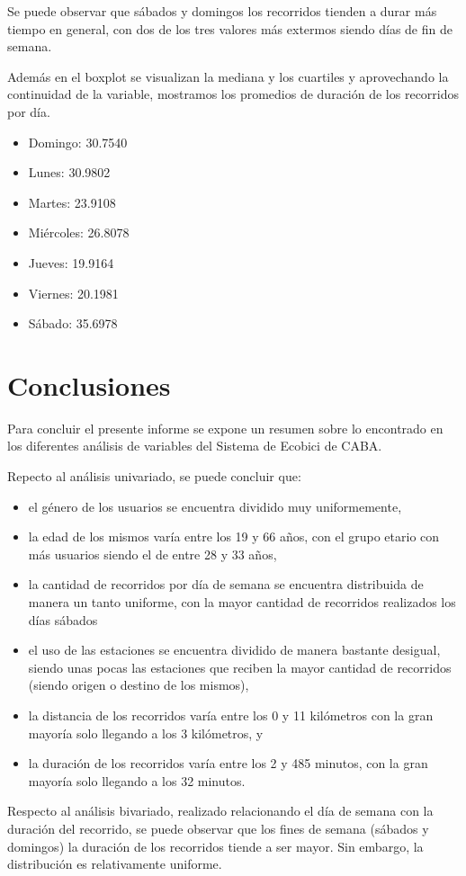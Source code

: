 \documentclass[11pt]{article}
\begin{document}
    Se puede observar que s\'abados y domingos los recorridos tienden a durar m\'as tiempo en general, con dos de los tres valores m\'as extermos siendo d\'ias de fin de semana. %

    Adem\'as en el boxplot se visualizan la mediana y los cuartiles y aprovechando la continuidad de la variable, mostramos los promedios de duraci\'on de los recorridos por d\'ia.

    \begin{itemize}
      \item Domingo: 30.7540
      \item Lunes: 30.9802
      \item Martes: 23.9108
      \item Mi\'ercoles: 26.8078
      \item Jueves: 19.9164
      \item Viernes: 20.1981
      \item S\'abado: 35.6978
    \end{itemize}

    \section{Conclusiones}
    Para concluir el presente informe se expone un resumen sobre lo encontrado en los diferentes an\'alisis de variables del Sistema de Ecobici de CABA.

    Repecto al an\'alisis univariado, se puede concluir que: 
    \begin{itemize}
      \item el g\'enero de los usuarios se encuentra dividido muy uniformemente, 
      \item la edad de los mismos var\'ia entre los 19 y 66 años, con el grupo etario con m\'as usuarios siendo el de entre 28 y 33 a\~{n}os,
      \item la cantidad de recorridos por d\'ia de semana se encuentra distribuida de manera un tanto uniforme, con la mayor cantidad de recorridos realizados los d\'ias s\'abados
      \item el uso de las estaciones se encuentra dividido de manera bastante desigual, siendo unas pocas las estaciones que reciben la mayor cantidad de recorridos (siendo origen o destino de los mismos),
      \item la distancia de los recorridos var\'ia entre los 0 y 11 kilómetros con la gran mayor\'ia solo llegando a los 3 kil\'ometros, y
      \item la duraci\'on de los recorridos var\'ia entre los 2 y 485 minutos, con la gran mayor\'ia solo llegando a los 32 minutos.
    \end{itemize}
      
    Respecto al an\'alisis bivariado, realizado relacionando el d\'ia de semana con la duraci\'on del recorrido, se puede observar que los fines de semana (s\'abados y domingos) la duraci\'on de los recorridos tiende a ser mayor. Sin embargo, la distribuci\'on es relativamente uniforme.
\end{document}
